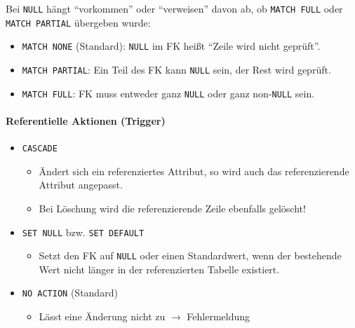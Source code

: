             		Bei \lstinline|NULL| hängt \enquote{vorkommen} oder \enquote{verweisen} davon ab, ob \lstinline|MATCH FULL| oder \lstinline|MATCH PARTIAL| übergeben wurde:
            		\begin{itemize}
            			\item \lstinline|MATCH NONE| (Standard): \lstinline|NULL| im FK heißt \enquote{Zeile wird nicht geprüft}.
            			\item \lstinline|MATCH PARTIAL|: Ein Teil des FK kann \lstinline|NULL| sein, der Rest wird geprüft.
            			\item \lstinline|MATCH FULL|: FK muss entweder ganz \lstinline|NULL| oder ganz non-\lstinline|NULL| sein.
            		\end{itemize}
            	
            	\paragraph{Referentielle Aktionen (Trigger)}
					\begin{itemize}
						\item \lstinline|CASCADE|
							\begin{itemize}
								\item Ändert sich ein referenziertes Attribut, so wird auch das referenzierende Attribut angepasst.
								\item Bei Löschung wird die referenzierende Zeile ebenfalls gelöscht!
							\end{itemize}
						\item \lstinline|SET NULL| bzw. \lstinline|SET DEFAULT|
							\begin{itemize}
								\item Setzt den FK auf \lstinline|NULL| oder einen Standardwert, wenn der bestehende Wert nicht länger in der referenzierten Tabelle existiert.
							\end{itemize}
						\item \lstinline|NO ACTION| (Standard)
							\begin{itemize}
								\item Lässt eine Änderung nicht zu \(\rightarrow\) Fehlermeldung
							\end{itemize}
					\end{itemize}

